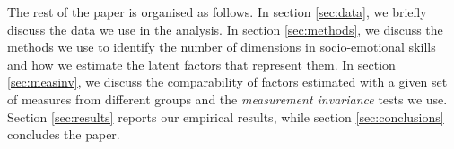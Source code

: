 The rest of the paper is organised as follows. In section \ref{sec:data}, we briefly discuss the data we use in the analysis. In section \ref{sec:methods}, we discuss the methods we use to identify the number of dimensions in socio-emotional skills and how we estimate the latent factors that represent them. In section \ref{sec:measinv}, we discuss the comparability of factors estimated with a given set of measures from different groups and the \emph{measurement invariance} tests we use. Section \ref{sec:results} reports our empirical results, while section \ref{sec:conclusions} concludes the paper.
